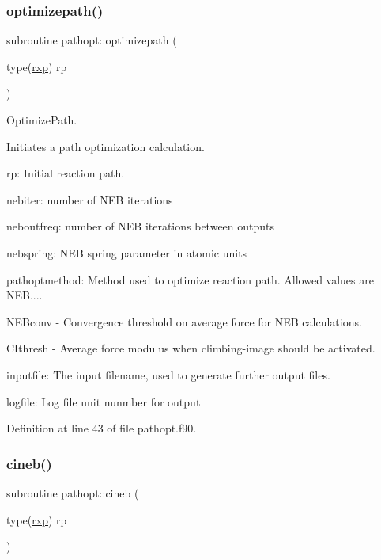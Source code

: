 \subsubsection{\texorpdfstring{optimizepath()}{optimizepath()}}
{\footnotesize\ttfamily subroutine pathopt\+::optimizepath (\begin{DoxyParamCaption}\item[{type(\mbox{\hyperlink{structrpath_1_1rxp}{rxp}})}]{rp }\end{DoxyParamCaption})}



Optimize\+Path. 

Initiates a path optimization calculation.


\begin{DoxyItemize}
\item rp\+: Initial reaction path.
\item nebiter\+: number of N\+EB iterations
\item neboutfreq\+: number of N\+EB iterations between outputs
\item nebspring\+: N\+EB spring parameter in atomic units
\item pathoptmethod\+: Method used to optimize reaction path. Allowed values are \textquotesingle{}N\+EB\textquotesingle{}....
\item N\+E\+Bconv -\/ Convergence threshold on average force for N\+EB calculations.
\item C\+Ithresh -\/ Average force modulus when climbing-\/image should be activated.
\item inputfile\+: The input filename, used to generate further output files.
\item logfile\+: Log file unit nunmber for output 
\end{DoxyItemize}

Definition at line 43 of file pathopt.\+f90.

\mbox{\label{namespacepathopt_af8fbe251f61b7f4e756605041e19e1a0}} 
\subsubsection{\texorpdfstring{cineb()}{cineb()}}
{\footnotesize\ttfamily subroutine pathopt\+::cineb (\begin{DoxyParamCaption}\item[{type(\mbox{\hyperlink{structrpath_1_1rxp}{rxp}})}]{rp }\end{DoxyParamCaption})}



